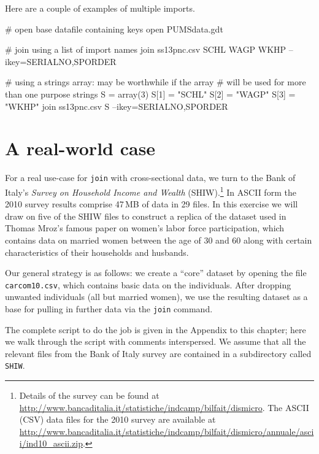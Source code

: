 Here are a couple of examples of multiple imports.
\begin{code}
# open base datafile containing keys
open PUMSdata.gdt

# join using a list of import names
join ss13pnc.csv SCHL WAGP WKHP --ikey=SERIALNO,SPORDER

# using a strings array: may be worthwhile if the array
# will be used for more than one purpose
strings S = array(3)
S[1] = "SCHL"
S[2] = "WAGP"
S[3] = "WKHP"
join ss13pnc.csv S --ikey=SERIALNO,SPORDER
\end{code}

\section{A real-world case}
\label{sec:join-SHIW}

For a real use-case for \texttt{join} with cross-sectional data, we
turn to the Bank of Italy's \textit{Survey on Household Income and
  Wealth} (SHIW).\footnote{Details of the survey can be found at
  \url{http://www.bancaditalia.it/statistiche/indcamp/bilfait/dismicro}.
  The ASCII (CSV) data files for the 2010 survey are available at
  \url{http://www.bancaditalia.it/statistiche/indcamp/bilfait/dismicro/annuale/ascii/ind10_ascii.zip}.}
In ASCII form the 2010 survey results comprise 47\,MB of data in 29
files. In this exercise we will draw on five of the SHIW files to
construct a replica of the dataset used in Thomas Mroz's famous paper
\citep{mroz87} on women's labor force participation, which contains
data on married women between the age of 30 and 60 along with certain
characteristics of their households and husbands.

Our general strategy is as follows: we create a ``core'' dataset by
opening the file \texttt{carcom10.csv}, which contains basic data on
the individuals. After dropping unwanted individuals (all but married
women), we use the resulting dataset as a base for pulling in further
data via the \texttt{join} command.

The complete script to do the job is given in the Appendix to this
chapter; here we walk through the script with comments interspersed.
We assume that all the relevant files from the Bank of Italy survey
are contained in a subdirectory called \texttt{SHIW}.

